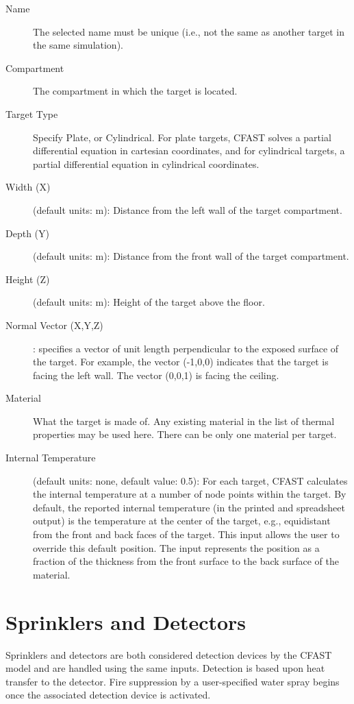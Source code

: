 \begin{description}
\item[Name] The selected name must be unique (i.e., not the same as another target in the same simulation).
\item[Compartment] The compartment in which the target is located.
\item[Target Type] Specify Plate, or Cylindrical.  For plate targets, CFAST solves a partial differential equation in cartesian coordinates, and for cylindrical targets, a partial differential equation in cylindrical coordinates.
\item[Width (X)] (default units: m): Distance from the left wall of the target compartment.
\item[Depth (Y)] (default units: m): Distance from the front wall of the target compartment.
\item[Height (Z)] (default units: m): Height of the target above the floor.
\item[Normal Vector (X,Y,Z)]: specifies a vector of unit length perpendicular to the exposed surface of the target. For example, the vector (-1,0,0) indicates that the target is facing the left wall. The vector (0,0,1) is facing the ceiling.
\item[Material] What the target is made of. Any existing material in the list of thermal properties may be used here. There can be only one material per target.
\item[Internal Temperature] (default units: none, default value: 0.5): For each target, CFAST calculates the internal temperature at a number of node points within the target. By default, the reported internal temperature (in the printed and spreadsheet output) is the temperature at the center of the target, e.g., equidistant from the front and back faces of the target. This input allows the user to override this default position. The input represents the position as a fraction of the thickness from the front surface to the back surface of the material.
\end{description}





\section{Sprinklers and Detectors}
\label{info:DEVC2}
Sprinklers and detectors are both considered detection devices by the CFAST model and are handled using the same inputs.  Detection is based upon heat transfer to the detector. Fire suppression by a user-specified water spray begins once the associated detection device is activated.

